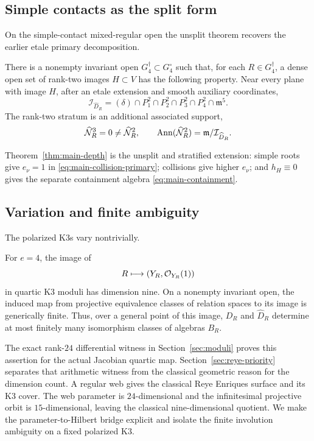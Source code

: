 \subsection*{Simple contacts as the split form}

On the simple-contact mixed-regular open the unsplit theorem recovers
the earlier etale primary decomposition.

\begin{theorem}\label{thm:main-coranktwo}
There is a nonempty invariant open
\(G_4^\dagger\subset G_4^\circ\) such that, for each
\(R\in G_4^\dagger\), a dense open set of rank-two images
\(H\subset V\) has the following property.  Near every plane with
image \(H\), after an etale extension and smooth auxiliary
coordinates,
\begin{equation}\label{eq:main-coranktwo}
 \mathcal I_{\widehat D_R}
 =
 (\delta)\cap P_1^2\cap P_2^2\cap P_3^2\cap P_4^2
 \cap\mathfrak m^5.
\end{equation}
The rank-two stratum is an additional associated support,
\[
 \widehat{\mathcal N}_R^3=0\ne\widehat{\mathcal N}_R^2,\qquad
 \operatorname{Ann}(\widehat{\mathcal N}_R^2)
 =\mathfrak m/\mathcal I_{\widehat D_R}.
\]
\end{theorem}

Theorem~\ref{thm:main-depth} is the unsplit and stratified extension:
simple roots give \(e_\nu=1\) in
\eqref{eq:main-collision-primary}; collisions give higher \(e_\nu\);
and \(h_H\equiv0\) gives the separate containment algebra
\eqref{eq:main-containment}.

\subsection*{Variation and finite ambiguity}

The polarized K3s vary nontrivially.

\begin{theorem}
\label{thm:main-moduli}
For \(e=4\), the image of
\[
 R\longmapsto(Y_R,\mathcal O_{Y_R}(1))
\]
in quartic K3 moduli has dimension nine.  On a nonempty invariant
open, the induced map from projective equivalence classes of relation
spaces to its image is generically finite.  Thus, over a general
point of this image, \(D_R\) and \(\widehat D_R\) determine at most
finitely many isomorphism classes of algebras \(B_R\).
\end{theorem}

The exact rank-\(24\) differential witness in
Section~\ref{sec:moduli} proves this assertion for the actual Jacobian
quartic map.  Section~\ref{sec:reye-priority} separates that arithmetic
witness from the classical geometric reason for the dimension count.
A regular web gives the classical Reye Enriques surface and its K3
cover.  The web parameter is \(24\)-dimensional and the infinitesimal
projective orbit is \(15\)-dimensional, leaving the classical
nine-dimensional quotient.  We make the parameter-to-Hilbert bridge
explicit and isolate the finite involution ambiguity on a fixed
polarized K3.

